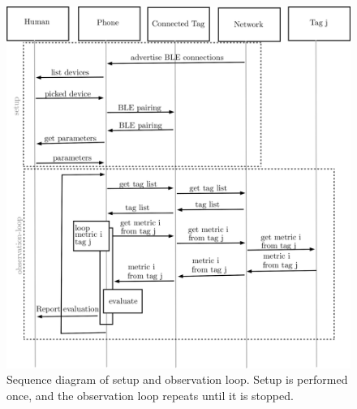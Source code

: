 \begin{figure}[ht!]
	\includegraphics[width=\linewidth]{graphics/schematics/obervation_loop.png}
	\caption{Sequence diagram of setup and observation loop. Setup is performed once, and the observation loop repeats until it is stopped.}
	\label{f:observation_loop}
\end{figure}

